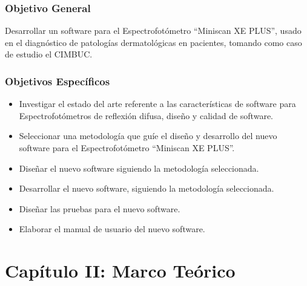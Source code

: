 \documentclass[12pt, a4paper]{article}
\begin{document}
	\subsubsection{Objetivo General}
	Desarrollar un software para el Espectrofot\'{o}metro ``Miniscan XE PLUS'', usado en el diagn\'{o}stico de patolog\'{i}as dermatol\'{o}gicas en pacientes, tomando como caso de estudio el CIMBUC.
	\subsubsection{Objetivos Espec\'{i}ficos}
	\begin{itemize}
		\item Investigar el estado del arte referente a las caracter\'{i}sticas de software para Espectrofot\'{o}metros de reflexi\'{o}n difusa, dise\~{n}o y calidad de software.
		\item Seleccionar una metodolog\'{i}a que gu\'{i}e el dise\~{n}o y desarrollo del nuevo software para el Espectrofot\'{o}metro ``Miniscan XE PLUS''.
		\item Dise\~{n}ar el nuevo software siguiendo la metodolog\'{i}a seleccionada.
		\item Desarrollar el nuevo software, siguiendo la metodolog\'{i}a seleccionada.
		\item Dise\~{n}ar las pruebas para el nuevo software.
		\item Elaborar el manual de usuario del nuevo software.
	\end{itemize}
\pagebreak
\section{Cap\'{i}tulo II: Marco Te\'{o}rico}
\end{document}
